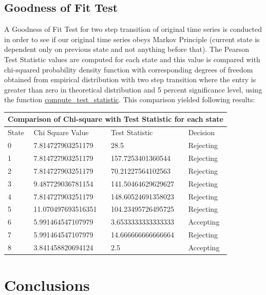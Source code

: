 \documentclass[a4paper, article, oneside, UKenglish]{memoir}
\newcommand{\0}{\mathbf{0}}
\newcommand{\1}{\mathbf{1}}
\begin{document}
\section{Goodness of Fit Test}
A Goodness of Fit Test for two step transition of original time series is conducted in order to see if our original time series obeys Markov Principle (current state is dependent only on previous state and not anything before that). The Pearson Test Statistic values are computed for each state and this value is compared with chi-squared probability density function with corresponding degrees of freedom obtained from empirical distribution with two step transition where the entry is greater than zero in theoretical distribution and 5 percent significance level, using the function \hyperref[sec:tscs]{compute\_test\_statistic}. This comparison yielded following results:


\setlength{\arrayrulewidth}{1mm}
\setlength{\tabcolsep}{18pt}
\renewcommand{\arraystretch}{2.5}

{
\begin{tabular}{ |p{0.3cm}|p{2.5cm}|p{2.5cm}|p{1.5cm}|  }
\hline
\multicolumn{4}{|c|}{Comparison of Chi-square with Test Statistic for each state} \\
\hline
State& Chi Square Value & Test Statistic & Decision\\
\hline
0 & 7.814727903251179  & 28.5                   & Rejecting\\
1 & 7.814727903251179  & 157.7253401360544       & Rejecting\\
2 & 7.814727903251179  & 70.21227564102563       & Rejecting\\
3 & 9.487729036781154  & 141.50464629629627       & Rejecting\\
4 & 7.814727903251179  & 148.60524691358023       & Rejecting\\
5 & 11.070497693516351 &  104.23495726495725      & Rejecting\\
6 & 5.991464547107979  &  3.6533333333333333       & Accepting\\
7 & 5.991464547107979  &  14.666666666666664       & Rejecting\\
8 & 3.841458820694124  &  2.5                   & Accepting\\

\hline
\end{tabular}
}

\vspace{10px}

\chapter{Conclusions}
\end{document}
